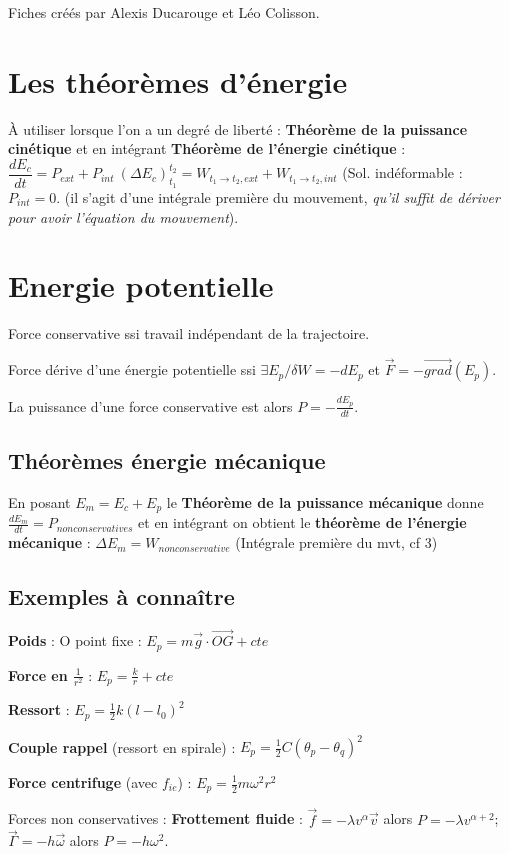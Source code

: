 \documentclass[9pt]{article}
\begin{document}
\begin{multicols*}{2}
\footnotesize{Fiches créés par Alexis Ducarouge et Léo Colisson.}

\section{Les théorèmes d'énergie}
À utiliser lorsque l'on a un degré de liberté :
\textbf{Théorème de la puissance cinétique} et en intégrant \textbf{Théorème de l'énergie cinétique} :
$\boxed{\dfrac{dE_c}{dt} = P_{ext} + P_{int}} \ \boxed{(\Delta E_c)_{t_1}^{t_2} = W_{t_1 \rightarrow t_2, ext} + W_{t_1 \rightarrow t_2, int}} $
(Sol. indéformable : $P_{int} = 0$. (il s'agit d'une intégrale première du mouvement, \textit{qu'il suffit de dériver pour avoir l'équation du mouvement}).

\section{Energie potentielle}
Force conservative ssi travail indépendant de la trajectoire.

Force dérive d'une énergie potentielle ssi $\exists E_p / \delta W = -d E_p$ et $\overrightarrow{F} = - \overrightarrow{grad}(E_p)$.

La puissance d'une force conservative est alors $P = -\frac{d E_p}{dt}$.

\subsection{Théorèmes énergie mécanique}
En posant $E_m = E_c + E_p$ le \textbf{Théorème de la puissance mécanique} donne $\boxed{\frac{dE_m}{dt} = P_{non conservatives}}$ et en intégrant on obtient le \textbf{théorème de l'énergie mécanique} : $\boxed{\Delta E_m = W_{non conservative}}$ (Intégrale première du mvt, cf 3)

\subsection{Exemples à connaître}
\textbf{Poids} : O point fixe : $E_p = m\overrightarrow{g}\cdot\overrightarrow{OG} + cte$

\textbf{Force en $\frac{1}{r^2}$} : $E_p = \frac{k}{r}+ cte$

\textbf{Ressort} : $E_p = \frac{1}{2} k (l - l_0)^2$

\textbf{Couple rappel} (ressort en spirale) : $E_p = \frac{1}{2} C (\theta_p - \theta_q)^2$

\textbf{Force centrifuge} (avec $f_{ie}$) : $E_p = \frac{1}{2}m\omega^2r^2$

Forces non conservatives :
\textbf{Frottement fluide} : $\overrightarrow{f} = -\lambda v^\alpha \overrightarrow{v}$ alors $P = -\lambda v^{\alpha+2}$;$\overrightarrow{\Gamma} = -h\overrightarrow{\omega}$ alors $P = -h\omega^2$.

\end{multicols*}
\end{document}
